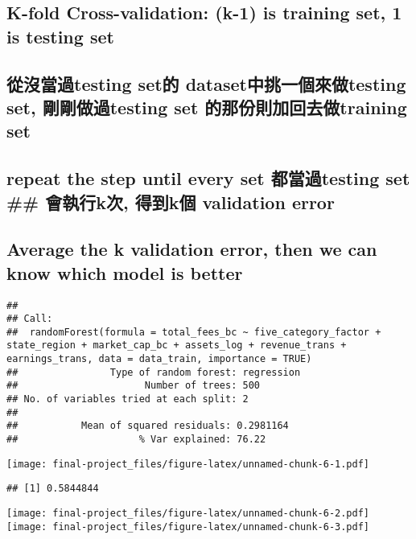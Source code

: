 \documentclass[
]{article}
\begin{document}
\hypertarget{k-fold-cross-validation-k-1-is-training-set-1-is-testing-set}{%
\subsection{K-fold Cross-validation: (k-1) is training set, 1 is testing
set}\label{k-fold-cross-validation-k-1-is-training-set-1-is-testing-set}}

\hypertarget{ux5f9eux6c92ux7576ux904etesting-setux7684-datasetux4e2dux6311ux4e00ux500bux4f86ux505atesting-set-ux525bux525bux505aux904etesting-set-ux7684ux90a3ux4efdux5247ux52a0ux56deux53bbux505atraining-set}{%
\subsection{從沒當過testing set的 dataset中挑一個來做testing set,
剛剛做過testing set 的那份則加回去做training
set}\label{ux5f9eux6c92ux7576ux904etesting-setux7684-datasetux4e2dux6311ux4e00ux500bux4f86ux505atesting-set-ux525bux525bux505aux904etesting-set-ux7684ux90a3ux4efdux5247ux52a0ux56deux53bbux505atraining-set}}

\hypertarget{repeat-the-step-until-every-set-ux90fdux7576ux904etesting-set-ux6703ux57f7ux884ckux6b21-ux5f97ux5230kux500b-validation-error}{%
\subsection{repeat the step until every set 都當過testing set \#\#
會執行k次, 得到k個 validation
error}\label{repeat-the-step-until-every-set-ux90fdux7576ux904etesting-set-ux6703ux57f7ux884ckux6b21-ux5f97ux5230kux500b-validation-error}}

\hypertarget{average-the-k-validation-error-then-we-can-know-which-model-is-better}{%
\subsection{Average the k validation error, then we can know which model
is
better}\label{average-the-k-validation-error-then-we-can-know-which-model-is-better}}

\begin{verbatim}
## 
## Call:
##  randomForest(formula = total_fees_bc ~ five_category_factor +      state_region + market_cap_bc + assets_log + revenue_trans +      earnings_trans, data = data_train, importance = TRUE) 
##                Type of random forest: regression
##                      Number of trees: 500
## No. of variables tried at each split: 2
## 
##           Mean of squared residuals: 0.2981164
##                     % Var explained: 76.22
\end{verbatim}

\texttt{[image: final-project\_files/figure-latex/unnamed-chunk-6-1.pdf]}

\begin{verbatim}
## [1] 0.5844844
\end{verbatim}

\texttt{[image: final-project\_files/figure-latex/unnamed-chunk-6-2.pdf]}
\texttt{[image: final-project\_files/figure-latex/unnamed-chunk-6-3.pdf]}
\end{document}

